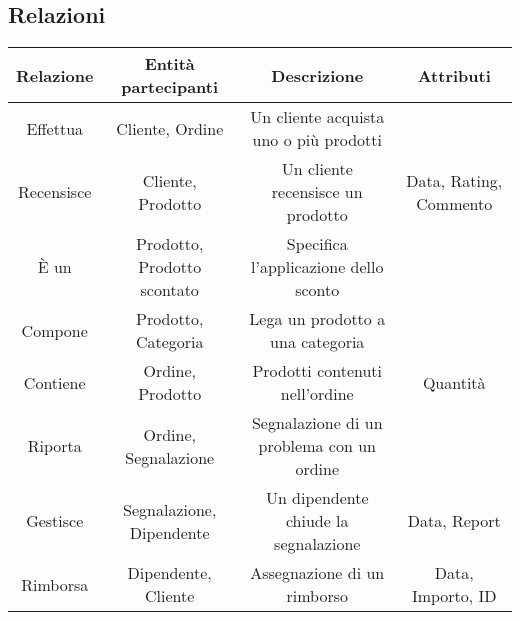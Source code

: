 \subsection{Relazioni}
\begin{center}
\begin{tabular}{ |c|c|c|c|} 
\hline
Relazione & Entità partecipanti & Descrizione & Attributi \\
\hline
\multirow{3}{6em}{Effettua} & \multirow{3}{9em}{Cliente, Ordine} & \multirow{3}{12em}{Un cliente acquista uno o più prodotti} & \multirow{3}{9em}{} \\
 &  &  & \\
 &  &  & \\
\hline

\multirow{3}{6em}{Recensisce} & \multirow{3}{9em}{Cliente, Prodotto} & \multirow{3}{12em}{Un cliente recensisce un prodotto} & \multirow{3}{9em}{Data, Rating, Commento} \\
 &  &  & \\
 &  &  & \\
\hline

\multirow{3}{6em}{È un} & \multirow{3}{9em}{Prodotto, Prodotto scontato} & \multirow{3}{12em}{Specifica l'applicazione dello sconto} & \multirow{3}{9em}{} \\
 &  &  & \\
 &  &  & \\
\hline

\multirow{3}{6em}{Compone} & \multirow{3}{9em}{Prodotto, Categoria} & \multirow{3}{12em}{Lega un prodotto a una categoria} & \multirow{3}{9em}{} \\
 &  &  & \\
 &  &  & \\ 
\hline

\multirow{3}{6em}{Contiene} & \multirow{3}{9em}{Ordine, Prodotto} & \multirow{3}{12em}{Prodotti contenuti nell'ordine} & \multirow{3}{9em}{Quantità} \\
 &  &  & \\
 &  &  & \\
\hline

\multirow{3}{6em}{Riporta} & \multirow{3}{9em}{Ordine, Segnalazione} & \multirow{3}{12em}{Segnalazione di un problema con un ordine} & \multirow{3}{9em}{} \\
 &  &  & \\
 &  &  & \\
\hline

\multirow{3}{6em}{Gestisce} & \multirow{3}{9em}{Segnalazione, Dipendente} & \multirow{3}{12em}{Un dipendente chiude la segnalazione} & \multirow{3}{9em}{Data, Report} \\
&  &  & \\
&  &  & \\ 
\hline

\multirow{3}{6em}{Rimborsa} & \multirow{3}{9em}{Dipendente, Cliente} & \multirow{3}{12em}{Assegnazione di un rimborso} & \multirow{3}{9em}{Data, Importo, ID} \\
&  &  & \\
&  &  & \\ 
\hline
\end{tabular}
\end{center}